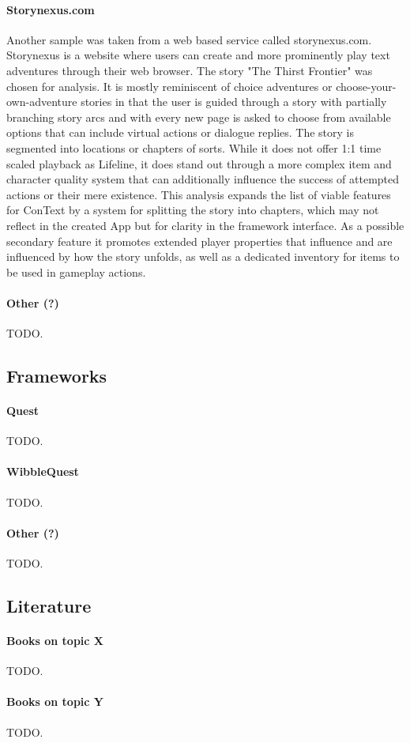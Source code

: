 \paragraph{Storynexus.com}
Another sample was taken from a web based service called storynexus.com. Storynexus is a website where users can create and more prominently play text adventures through their web browser. The story "The Thirst Frontier" was chosen for analysis. It is mostly reminiscent of choice adventures or choose-your-own-adventure stories in that the user is guided through a story with partially branching story arcs and with every new page is asked to choose from available options that can include virtual actions or dialogue replies. The story is segmented into locations or chapters of sorts. While it does not offer 1:1 time scaled playback as Lifeline, it does stand out through a more complex item and character quality system that can additionally influence the success of attempted actions or their mere existence. 
This analysis expands the list of viable features for ConText by a system for splitting the story into chapters, which may not reflect in the created App but for clarity in the framework interface. As a possible secondary feature it promotes extended player properties that influence and are influenced by how the story unfolds, as well as a dedicated inventory for items to be used in gameplay actions. 
\paragraph{Other (?)}
TODO.

\subsection{Frameworks}
\paragraph{Quest}
TODO.
\paragraph{WibbleQuest}
TODO.
\paragraph{Other (?)}
TODO.

\subsection{Literature}
\paragraph{Books on topic X}
TODO.
\paragraph{Books on topic Y}
TODO.